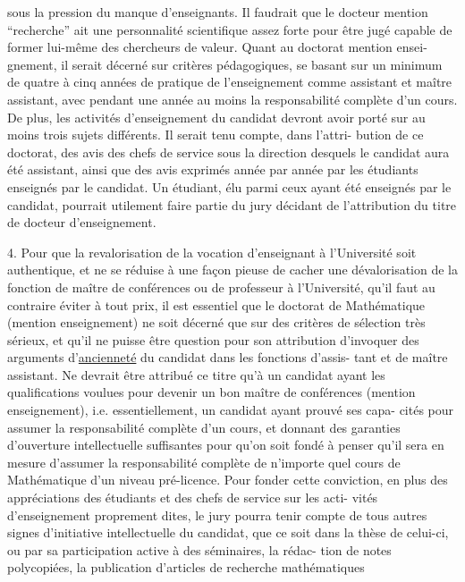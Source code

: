 
sous la pression du manque d'enseignants. Il faudrait que le docteur mention
``recherche'' ait une personnalité scientifique assez forte pour être jugé capable
de former lui-même des chercheurs de valeur. Quant au doctorat mention ensei-%
gnement, il serait décerné sur critères pédagogiques, se basant sur un minimum
de quatre à cinq années de pratique de l'enseignement comme assistant et maître
assistant, avec pendant une année au moins la responsabilité complète d'un
cours. De plus, les activités d'enseignement du candidat devront avoir porté
sur au moins trois sujets différents. Il serait tenu compte, dans l'attri-%
bution de ce doctorat, des avis des chefs de service sous la direction desquels
le candidat aura été assistant, ainsi que des avis exprimés année par année par
les étudiants enseignés par le candidat. Un étudiant, élu parmi ceux ayant été
enseignés par le candidat, pourrait utilement faire partie du jury décidant de
l'attribution du titre de docteur d'enseignement.

4. Pour que la revalorisation de la vocation d'enseignant à l'Université soit
authentique, et ne se réduise à une façon pieuse de cacher une dévalorisation
de la fonction de maître de conférences ou de professeur à l'Université, qu'il
faut au contraire éviter à tout prix, il est essentiel que le doctorat de
Mathématique (mention enseignement) ne soit décerné que sur des critères de
sélection très sérieux, et qu'il ne puisse être question pour son attribution
d'invoquer des arguments d'\uline{ancienneté} du candidat dans les fonctions d'assis-%
tant et de maître assistant. Ne devrait être attribué ce titre qu'à un candidat
ayant les qualifications voulues pour devenir un bon maître de conférences
(mention enseignement), i.e. essentiellement, un candidat ayant prouvé ses capa-%
cités pour assumer la responsabilité complète d'un cours, et donnant des
garanties d'ouverture intellectuelle suffisantes pour qu'on soit fondé à penser
qu'il sera en mesure d'assumer la responsabilité complète de n'importe quel
cours de Mathématique d'un niveau pré-licence. Pour fonder cette conviction,
en plus des appréciations des étudiants et des chefs de service sur les acti-%
vités d'enseignement proprement dites, le jury pourra tenir compte de tous
autres signes d'initiative intellectuelle du candidat, que ce soit dans la
thèse de celui-ci, ou par sa participation active à des séminaires, la rédac-%
tion de notes polycopiées, la publication d'articles de recherche mathématiques

